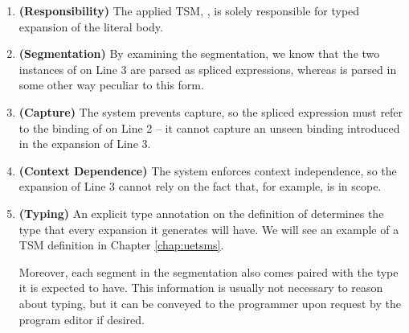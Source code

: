 \begin{enumerate}
\item \textbf{(Responsibility)} The applied TSM, , is solely responsible for typed expansion of the literal body. 
\item \textbf{(Segmentation)} By examining the segmentation, we know that the two instances of  on Line 3 are parsed as spliced expressions, whereas  is parsed in some other way peculiar to this form.
\item \textbf{(Capture)} The system prevents capture, so the spliced expression  must refer to the binding of  on Line 2 -- it cannot capture an unseen binding introduced in the expansion of Line 3.
\item \textbf{(Context Dependence)} The system enforces context independence, so the expansion of Line 3 cannot  rely on the fact that, for example,  is in scope.
\item \textbf{(Typing)} An explicit type annotation on the definition of  determines the type that every expansion it generates will have. We will see an example of a TSM definition in Chapter \ref{chap:uetsms}. 

Moreover, each segment in the segmentation also comes paired with the type it is expected to have. This information is usually not necessary to reason about typing, but it can be conveyed to the programmer upon request by the program editor if desired. %
\end{enumerate}





